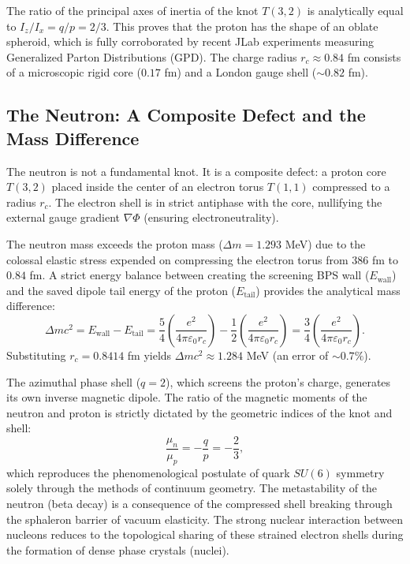 \documentclass[12pt,a4paper]{article}
\begin{document}
The ratio of the principal axes of inertia of the knot $T(3,2)$ is analytically equal to $I_z / I_x = q/p = 2/3$. This proves that the proton has the shape of an oblate spheroid, which is fully corroborated by recent JLab experiments measuring Generalized Parton Distributions (GPD). The charge radius $r_c \approx 0.84$ fm consists of a microscopic rigid core ($0.17$ fm) and a London gauge shell ($\sim 0.82$ fm).

\subsection{The Neutron: A Composite Defect and the Mass Difference}
The neutron is not a fundamental knot. It is a composite defect: a proton core $T(3,2)$ placed inside the center of an electron torus $T(1,1)$ compressed to a radius $r_c$. The electron shell is in strict antiphase with the core, nullifying the external gauge gradient $\nabla \Phi$ (ensuring electroneutrality). 

The neutron mass exceeds the proton mass ($\Delta m = 1.293$ MeV) due to the colossal elastic stress expended on compressing the electron torus from $386$ fm to $0.84$ fm. A strict energy balance between creating the screening BPS wall ($E_{\text{wall}}$) and the saved dipole tail energy of the proton ($E_{\text{tail}}$) provides the analytical mass difference:
\begin{equation}
	\Delta m c^2 = E_{\text{wall}} - E_{\text{tail}} = \frac{5}{4} \left( \frac{e^2}{4\pi\varepsilon_0 r_c} \right) - \frac{1}{2} \left( \frac{e^2}{4\pi\varepsilon_0 r_c} \right) = \frac{3}{4} \left( \frac{e^2}{4\pi\varepsilon_0 r_c} \right).
\end{equation}
Substituting $r_c = 0.8414$ fm yields $\Delta m c^2 \approx 1.284$ MeV (an error of $\sim 0.7\%$).

The azimuthal phase shell ($q=2$), which screens the proton's charge, generates its own inverse magnetic dipole. The ratio of the magnetic moments of the neutron and proton is strictly dictated by the geometric indices of the knot and shell:
\begin{equation}
	\frac{\mu_n}{\mu_p} = -\frac{q}{p} = -\frac{2}{3},
\end{equation}
which reproduces the phenomenological postulate of quark $SU(6)$ symmetry solely through the methods of continuum geometry. The metastability of the neutron (beta decay) is a consequence of the compressed shell breaking through the sphaleron barrier of vacuum elasticity. The strong nuclear interaction between nucleons reduces to the topological sharing of these strained electron shells during the formation of dense phase crystals (nuclei).
\end{document}
